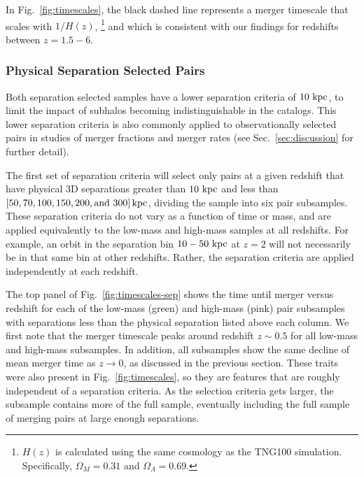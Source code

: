 \documentclass[twocolumn,linenumbers]{aastex631}
\begin{document}
        In Fig.~\ref{fig:timescales}, the black dashed line represents a merger timescale that scales with $1/H(z)$,
        \footnote{$H(z)$ is calculated using the same cosmology as the TNG100 simulation. Specifically, $\Omega_M=0.31$ and $\Omega_{\Lambda}=0.69$.}
        and which is consistent with our findings for redshifts between $z=1.5-6$. 
            

    \subsubsection{Physical Separation Selected Pairs }
    \label{sec:results-phys}
        Both separation selected samples have a lower separation criteria of $10\,\mathrm{\,kpc}$, to limit the impact of subhalos becoming indistinguishable in the \subfind{} catalogs.
        This lower separation criteria is also commonly applied to observationally selected pairs in studies of merger fractions and merger rates (see Sec.~\ref{sec:discussion} for further detail).
        
        The first set of separation criteria will select only pairs at a given redshift that have physical 3D separations greater than $10\,\mathrm{\,kpc}$ and less than $[50, 70, 100, 150, 200, \mbox{and }300]\mathrm{\,kpc}$, dividing the sample into six pair subsamples. 
        These separation criteria do not vary as a function of time or mass, and are applied equivalently to the low-mass and high-mass samples at all redshifts. 
        For example, an orbit in the separation bin $10-50\,\mathrm{\,kpc}$ at $z=2$ will not necessarily be in that same bin at other redshifts. 
        Rather, the separation criteria are applied independently at each redshift. 
        
        The top panel of Fig.~\ref{fig:timescales-sep} shows the time until merger versus redshift for each of the low-mass (green) and high-mass (pink) pair subsamples with separations less than the physical separation listed above each column.  
        We first note that the merger timescale peaks around redshift $z\sim0.5$ for all low-mass and high-mass subsamples. 
        In addition, all subsamples show the same decline of mean merger time as $z\to0$, as discussed in the previous section. 
        These traits were also present in Fig.~\ref{fig:timescales}, so they are features that are roughly independent of a separation criteria.
        As the selection criteria gets larger, the subsample contains more of the full sample, eventually including the full sample of merging pairs at large enough separations.
        
\end{document}
